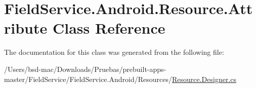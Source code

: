 \hypertarget{class_field_service_1_1_android_1_1_resource_1_1_attribute}{\section{Field\+Service.\+Android.\+Resource.\+Attribute Class Reference}
\label{class_field_service_1_1_android_1_1_resource_1_1_attribute}
}


The documentation for this class was generated from the following file\+:\begin{DoxyCompactItemize}
\item 
/\+Users/bsd-\/mac/\+Downloads/\+Pruebas/prebuilt-\/apps-\/master/\+Field\+Service/\+Field\+Service.\+Android/\+Resources/\hyperlink{_field_service_8_android_2_resources_2_resource_8designer_8cs}{Resource.\+Designer.\+cs}\end{DoxyCompactItemize}
